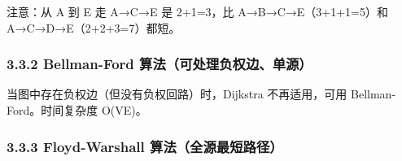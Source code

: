 \begin{Shaded}
\begin{Highlighting}[]
\end{Highlighting}
\end{Shaded}

注意：从 A 到 E 走 A→C→E 是 2+1=3，比 A→B→C→E（3+1+1=5）和
A→C→D→E（2+2+3=7）都短。

\subsubsection{3.3.2 Bellman-Ford
算法（可处理负权边、单源）}\label{bellman-ford-ux7b97ux6cd5ux53efux5904ux7406ux8d1fux6743ux8fb9ux5355ux6e90}

当图中存在负权边（但没有负权回路）时，Dijkstra 不再适用，可用
Bellman-Ford。时间复杂度 O(VE)。

\begin{Shaded}
\begin{Highlighting}[]
\NormalTok{(}\NormalTok{, }\OperatorTok{=}\NormalTok{))}
\NormalTok{(}\NormalTok{, }\OperatorTok{=}\NormalTok{))}
\end{Highlighting}
\end{Shaded}

\begin{Shaded}
\begin{Highlighting}[]
\end{Highlighting}
\end{Shaded}

\subsubsection{3.3.3 Floyd-Warshall
算法（全源最短路径）}\label{floyd-warshall-ux7b97ux6cd5ux5168ux6e90ux6700ux77edux8defux5f84}

